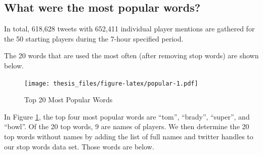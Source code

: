 \documentclass[12pt,twoside]{reedthesis}
\newenvironment{Shaded}{\begin{snugshade}}{\end{snugshade}}
\newcommand{\KeywordTok}[1]{\textcolor[rgb]{0.13,0.29,0.53}{\textbf{#1}}}
\newcommand{\DataTypeTok}[1]{\textcolor[rgb]{0.13,0.29,0.53}{#1}}
\newcommand{\StringTok}[1]{\textcolor[rgb]{0.31,0.60,0.02}{#1}}
\newcommand{\CommentTok}[1]{\textcolor[rgb]{0.56,0.35,0.01}{\textit{#1}}}
\newcommand{\OtherTok}[1]{\textcolor[rgb]{0.56,0.35,0.01}{#1}}
\newcommand{\OperatorTok}[1]{\textcolor[rgb]{0.81,0.36,0.00}{\textbf{#1}}}
\newcommand{\NormalTok}[1]{#1}
\begin{document}
\subsection{What were the most popular
words?}\label{what-were-the-most-popular-words}

In total, 618,628 tweets with 652,411 individual player mentions are
gathered for the 50 starting players during the 7-hour specified period.

The 20 words that are used the most often (after removing stop words)
are shown below.

\small
\begin{Shaded}
\end{Shaded}
\begin{figure}
\centering
\texttt{[image: thesis\_files/figure-latex/popular-1.pdf]}
\caption{\label{fig:popular}Top 20 Most Popular Words}
\end{figure}
\normalsize
In Figure \ref{fig:popular}, the top four most popular words are
``tom'', ``brady'', ``super'', and ``bowl''. Of the 20 top words, 9 are
names of players. We then determine the 20 top words without names by
adding the list of full names and twitter handles to our stop words data
set. Those words are below.
\end{document}
